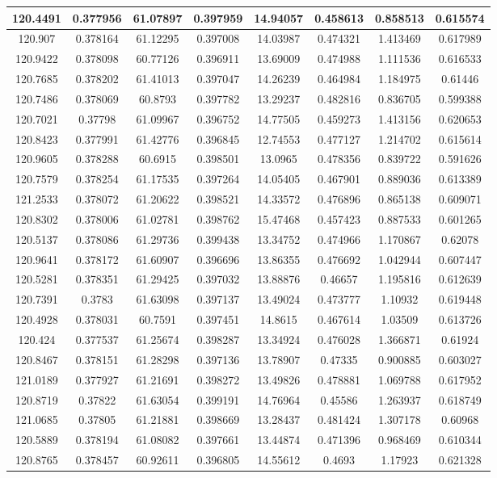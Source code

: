 \documentclass[preprint,review,11pt]{elsarticle}
\begin{document}
\begin{longtable}{|c|c|c|c|c|c|c|c|}
				120.4491 & 0.377956 & 61.07897 & 0.397959 & 14.94057 & 0.458613 & 0.858513 & 0.615574 \\ \hline
				120.907  & 0.378164 & 61.12295 & 0.397008 & 14.03987 & 0.474321 & 1.413469 & 0.617989 \\ \hline
				120.9422 & 0.378098 & 60.77126 & 0.396911 & 13.69009 & 0.474988 & 1.111536 & 0.616533 \\ \hline
				120.7685 & 0.378202 & 61.41013 & 0.397047 & 14.26239 & 0.464984 & 1.184975 & 0.61446  \\ \hline
				120.7486 & 0.378069 & 60.8793  & 0.397782 & 13.29237 & 0.482816 & 0.836705 & 0.599388 \\ \hline
				120.7021 & 0.37798  & 61.09967 & 0.396752 & 14.77505 & 0.459273 & 1.413156 & 0.620653 \\ \hline
				120.8423 & 0.377991 & 61.42776 & 0.396845 & 12.74553 & 0.477127 & 1.214702 & 0.615614 \\ \hline
				120.9605 & 0.378288 & 60.6915  & 0.398501 & 13.0965  & 0.478356 & 0.839722 & 0.591626 \\ \hline
				120.7579 & 0.378254 & 61.17535 & 0.397264 & 14.05405 & 0.467901 & 0.889036 & 0.613389 \\ \hline
				121.2533 & 0.378072 & 61.20622 & 0.398521 & 14.33572 & 0.476896 & 0.865138 & 0.609071 \\ \hline
				120.8302 & 0.378006 & 61.02781 & 0.398762 & 15.47468 & 0.457423 & 0.887533 & 0.601265 \\ \hline
				120.5137 & 0.378086 & 61.29736 & 0.399438 & 13.34752 & 0.474966 & 1.170867 & 0.62078  \\ \hline
				120.9641 & 0.378172 & 61.60907 & 0.396696 & 13.86355 & 0.476692 & 1.042944 & 0.607447 \\ \hline
				120.5281 & 0.378351 & 61.29425 & 0.397032 & 13.88876 & 0.46657  & 1.195816 & 0.612639 \\ \hline
				120.7391 & 0.3783   & 61.63098 & 0.397137 & 13.49024 & 0.473777 & 1.10932  & 0.619448 \\ \hline
				120.4928 & 0.378031 & 60.7591  & 0.397451 & 14.8615  & 0.467614 & 1.03509  & 0.613726 \\ \hline
				120.424  & 0.377537 & 61.25674 & 0.398287 & 13.34924 & 0.476028 & 1.366871 & 0.61924  \\ \hline
				120.8467 & 0.378151 & 61.28298 & 0.397136 & 13.78907 & 0.47335  & 0.900885 & 0.603027 \\ \hline
				121.0189 & 0.377927 & 61.21691 & 0.398272 & 13.49826 & 0.478881 & 1.069788 & 0.617952 \\ \hline
				120.8719 & 0.37822  & 61.63054 & 0.399191 & 14.76964 & 0.45586  & 1.263937 & 0.618749 \\ \hline
				121.0685 & 0.37805  & 61.21881 & 0.398669 & 13.28437 & 0.481424 & 1.307178 & 0.60968  \\ \hline
				120.5889 & 0.378194 & 61.08082 & 0.397661 & 13.44874 & 0.471396 & 0.968469 & 0.610344 \\ \hline
				120.8765 & 0.378457 & 60.92611 & 0.396805 & 14.55612 & 0.4693   & 1.17923  & 0.621328 \\ \hline
				

\end{longtable}
\end{document}
